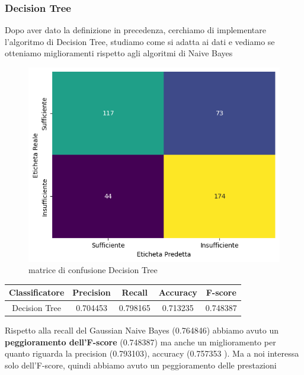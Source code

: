 \documentclass{article}
\begin{document}
\begin{titlepage}
        \subsubsection{Decision Tree}
        Dopo aver dato la definizione in precedenza, cerchiamo di implementare l'algoritmo di Decision Tree, studiamo come si adatta ai dati e vediamo se otteniamo miglioramenti rispetto agli algoritmi di Naive Bayes

        \begin{figure}[ht]
            \centering
            \includegraphics[width=0.6\linewidth]{confusion_matrix-DT.png}
            \caption{  matrice di confusione Decision Tree}
            \label{fig:enter-label}
        \end{figure}
        \begin{center}
        \begin{tabular}{|c|c|c|c|c|}
            \hline
            \textbf{Classificatore} & \textbf{Precision} & \textbf{Recall} & \textbf{Accuracy}& \textbf{F-score}\\ \hline
            Decision Tree & 0.704453 & 0.798165 & 0.713235 & 0.748387\\ \hline
        \end{tabular}
        \end{center}
        Rispetto alla recall del Gaussian Naive Bayes (0.764846) abbiamo avuto un \textbf{peggioramento dell'F-score} (0.748387) ma anche un miglioramento per quanto riguarda la precision (0.793103), accuracy (0.757353 ). Ma a noi interessa solo dell'F-score, quindi abbiamo avuto un peggioramento delle prestazioni
        \newpage

\end{titlepage}
\end{document}
